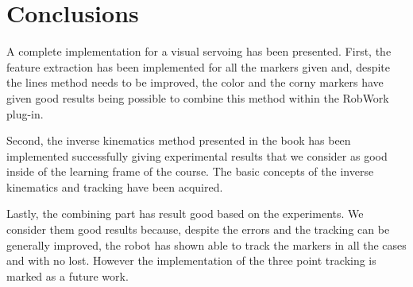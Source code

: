 \chapter{Conclusions} %
\label{chap:conclusions}
A complete implementation for a visual servoing has been presented. First, the feature extraction has been implemented for all the markers given and, despite the lines method needs to be improved, the color and the corny markers have given good results being possible to combine this method within the RobWork plug-in.

Second, the inverse kinematics method presented in the book has been implemented successfully giving experimental results that we consider as good inside of the learning frame of the course. The basic concepts of the inverse kinematics and tracking have been acquired.

Lastly, the combining part has result good based on the experiments. We consider them good results because, despite the errors and the tracking can be generally improved, the robot has shown able to track the markers in all the cases and with no lost. However the implementation of the three point tracking is marked as a future work.

